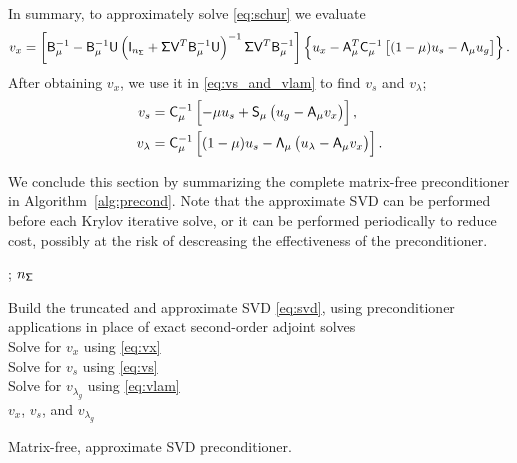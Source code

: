 In summary, to approximately solve \eqref{eq:schur} we evaluate
\begin{equation}\label{eq:vx}
  v_x = \left[\mathsf{B}_\mu^{-1} - \mathsf{B}_\mu^{-1} \mathsf{U}  \left(  \mathsf{I}_{n_{\mathsf{\Sigma}}} +  \mathsf{\Sigma} \mathsf{V}^{T} 
  \mathsf{B}_\mu^{-1} \mathsf{U} \right)^{-1} \mathsf{\Sigma} \mathsf{V}^{T} \mathsf{B}_\mu^{-1} \right]
  \left\{ u_x - \mathsf{A}_\mu^T \mathsf{C}_{\mu}^{-1} \left[(1-\mu) u_s -
  \mathsf{\Lambda}_\mu u_g \right]\right\}.
\end{equation}
After obtaining $v_x$, we use it in \eqref{eq:vs_and_vlam} to
find $v_s$ and $v_\lambda$;
\begin{align}
  v_s &= \mathsf{C}_\mu^{-1}\left[-\mu u_s + \mathsf{S}_\mu \left( u_g - \mathsf{A}_\mu v_x\right) \right], \label{eq:vs} \\
  v_\lambda &= \mathsf{C}_\mu^{-1}\left[(1-\mu)u_s - \mathsf{\Lambda}_\mu \left( u_\lambda - \mathsf{A}_\mu v_x \right) \right]. 
  \label{eq:vlam}
\end{align}


We conclude this section by summarizing the complete matrix-free preconditioner
in Algorithm~\ref{alg:precond}.  Note that the approximate SVD can be performed
before each Krylov iterative solve, or it can be performed periodically to
reduce cost, possibly at the risk of descreasing the effectiveness of the
preconditioner.

\LinesNumberedHidden
\begin{algorithm}[tbp]
\SetEndCharOfAlgoLine{}

;  $n_{\mathsf{\Sigma}}$
 
\BlankLine
Build the truncated and approximate SVD \eqref{eq:svd}, using 
preconditioner applications in place of exact second-order adjoint solves \\
Solve for $v_x$ using \eqref{eq:vx}\\
Solve for $v_s$ using \eqref{eq:vs}\\
Solve for $v_{\lambda_g}$ using \eqref{eq:vlam}\\
\Return $v_x$, $v_s$, and $v_{\lambda_g}$
\caption{Matrix-free, approximate SVD preconditioner. \label{alg:precond}}
\end{algorithm}

